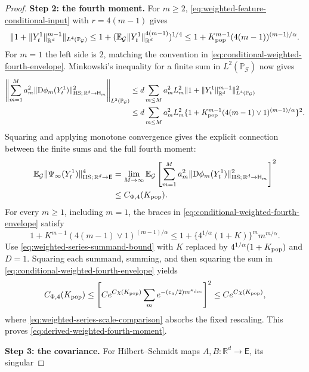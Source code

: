 \begin{proof}
\par\noindent\textbf{Step 2: the fourth moment.}
For $m\ge2$, \eqref{eq:weighted-feature-conditional-input} with $r=4(m-1)$
gives
\[
 \|1+\|Y_t^1\|_{\mathbb R^d}^{m-1}\|_{L^4(\mathbb P_{\mathcal G})}
 \le1+(\mathbb E_{\mathcal G}\|Y_t^1\|_{\mathbb R^d}^{4(m-1)})^{1/4}
 \le1+K_{\rm pop}^{m-1}(4(m-1))^{(m-1)/\alpha}.
\]
For $m=1$ the left side is $2$, matching the convention in
\eqref{eq:conditional-weighted-fourth-envelope}. Minkowski's inequality
for a finite sum in $L^2(\mathbb P_{\mathcal G})$ now gives
\[
\begin{aligned}
 \left\|\sum_{m=1}^M a_m^2
       \|\mathrm D\phi_m(Y_t^1)\|_{\mathrm{HS};\,\mathbb R^d\to\mathsf H_m}^2\right\|_{L^2(\mathbb P_{\mathcal G})}
 &\le d\sum_{m\le M}a_m^2L_m^2
       \|1+\|Y_t^1\|_{\mathbb R^d}^{m-1}\|_{L^4(\mathbb P_{\mathcal G})}^2\\
 &\le d\sum_{m\le M}a_m^2L_m^2
 \{1+K_{\rm pop}^{m-1}(4(m-1)\vee1)^{(m-1)/\alpha}\}^2.
\end{aligned}
\]
Squaring and applying monotone convergence gives the explicit connection
between the finite sums and the full fourth moment:
\begin{equation}
\label{eq:weighted-fourth-moment-limit}
\begin{aligned}
 \mathbb E_{\mathcal G}\|\Psi_\infty(Y_t^1)\|_{\mathrm{HS};\,\mathbb R^d\to\mathsf E}^4
 &=\lim_{M\to\infty}\mathbb E_{\mathcal G}
 \left[\sum_{m=1}^M a_m^2
          \|\mathrm D\phi_m(Y_t^1)\|_{\mathrm{HS};\,\mathbb R^d\to\mathsf H_m}^2\right]^2\\
 &\le C_{\Phi,4}(K_{\rm pop}).
\end{aligned}
\end{equation}
For every $m\ge1$, including $m=1$, the braces in
\eqref{eq:conditional-weighted-fourth-envelope} satisfy
\[
 1+K^{m-1}(4(m-1)\vee1)^{(m-1)/\alpha}
 \le 1+\{4^{1/\alpha}(1+K)\}^m m^{m/\alpha}.
\]
Use \eqref{eq:weighted-series-summand-bound} with
$K$ replaced by $4^{1/\alpha}(1+K_{\rm pop})$ and $D=1$.
Squaring each summand, summing, and then squaring the sum in
\eqref{eq:conditional-weighted-fourth-envelope} yields
\[
 C_{\Phi,4}(K_{\rm pop})
 \le\left[Ce^{C\chi(K_{\rm pop})}
           \sum_m e^{-(c_a/2)m^{\kappa_{\rm dec}}}\right]^2
 \le Ce^{C\chi(K_{\rm pop})},
\]
where \eqref{eq:weighted-series-scale-comparison} absorbs the fixed
rescaling. This proves \eqref{eq:derived-weighted-fourth-moment}.
\par\noindent\textbf{Step 3: the covariance.}
For Hilbert--Schmidt maps $A,B:\mathbb R^d\to\mathsf E$, its singular

\end{proof}

